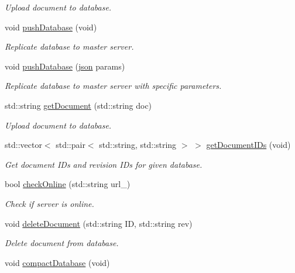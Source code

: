 \begin{DoxyCompactItemize}
\begin{DoxyCompactList}\small\item\em Upload document to database. \end{DoxyCompactList}\item 
void \hyperlink{class_client_a4983d1069b46cbb8926f9094853936c1}{push\+Database} (void)
\begin{DoxyCompactList}\small\item\em Replicate database to master server. \end{DoxyCompactList}\item 
void \hyperlink{class_client_a3ff5f11c6665c7b9c99476d158b02c01}{push\+Database} (\hyperlink{_couch_d_b_8hpp_ab701e3ac61a85b337ec5c1abaad6742d}{json} params)
\begin{DoxyCompactList}\small\item\em Replicate database to master server with specific parameters. \end{DoxyCompactList}\item 
std\+::string \hyperlink{class_client_a8f8ca876b5bc3b75cf642e5de8c25b20}{get\+Document} (std\+::string doc)
\begin{DoxyCompactList}\small\item\em Upload document to database. \end{DoxyCompactList}\item 
std\+::vector$<$ std\+::pair$<$ std\+::string, std\+::string $>$ $>$ \hyperlink{class_client_ad24ac9ee317e61cf04a565c4e849f31c}{get\+Document\+I\+Ds} (void)
\begin{DoxyCompactList}\small\item\em Get document I\+Ds and revision I\+Ds for given database. \end{DoxyCompactList}\item 
bool \hyperlink{class_client_ae504f5c93e2783a4ebb26ee94a002327}{check\+Online} (std\+::string url\+\_\+)
\begin{DoxyCompactList}\small\item\em Check if server is online. \end{DoxyCompactList}\item 
void \hyperlink{class_client_a45748961b6b8b534fa04e9a2bb40ed27}{delete\+Document} (std\+::string ID, std\+::string rev)
\begin{DoxyCompactList}\small\item\em Delete document from database. \end{DoxyCompactList}\item 
void \hyperlink{class_client_ab4703ff4ad0742e72c5416f33971cc2f}{compact\+Database} (void)
\end{DoxyCompactItemize}
